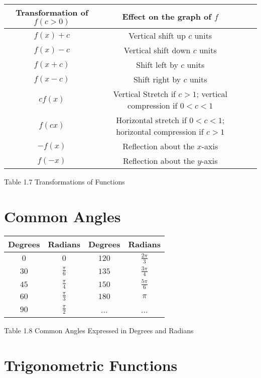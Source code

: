 \documentclass{book}
\begin{document}
\begin{table}[h]
    \centering
    \begin{tabular}{|c|c|c|c|}
    \hline
    Transformation of \(f(c>0)\) & Effect on the graph of \(f\) \\
    \hline
   \(f(x)+c\) & Vertical shift up \(c\) units \\
    \hline
    \(f(x)-c\) & Vertical shift down \(c\) units \\
    \hline
    \(f(x+c)\) & Shift left by \(c\) units \\
    \hline
    \(f(x-c)\) & Shift right by \(c\) units \\
    \hline
	\(cf(x)\) & Vertical Stretch if \(c>1\); vertical compression if \(0<c<1\) \\
	\hline
	\(f(cx)\) & Horizontal stretch if \(0<c<1\); horizontal compression if \(c>1\) \\
	\hline
	\(-f(x)\) & Reflection about the \(x\)-axis \\
	\hline
	\(f(-x)\) & Reflection about the \(y\)-axis \\
	\hline
    \end{tabular}
    \end{table}

	Table 1.7 Transformations of Functions

	\section{Common Angles}

	\begin{table}[h]
		\centering
		\begin{tabular}{|c|c|c|c|}
		\hline
		Degrees & Radians & Degrees & Radians \\
		\hline
	   \(0\) & \(0\) & \(120\) & \(\frac{2\pi}{3}\) \\
	   \hline
	\(30\) & \(\frac{\pi}{6}\) & \(135\) & \(\frac{3\pi}{4}\) \\
	\hline
	\(45\) & \(\frac{\pi}{4}\) & \(150\) & \(\frac{5\pi}{6}\) \\
	\hline
	\(60\) & \(\frac{\pi}{3}\) & \(180\) & \(\pi\) \\
	\hline
	\(90\) & \(\frac{\pi}{2}\) & ... & ... \\
	\hline
	\end{tabular}
	\end{table}

	Table 1.8 Common Angles Expressed in Degrees and Radians

\section{Trigonometric Functions}
\end{document}

